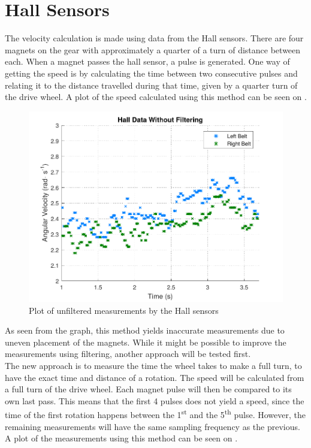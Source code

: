 \section{Hall Sensors}\label{sec:hallFiltering}

The velocity calculation is made using data from the Hall sensors. There are four magnets on the gear with approximately a quarter of a turn of distance between each. When a magnet passes the hall sensor, a pulse is generated. One way of getting the speed is by calculating the time between two consecutive pulses and relating it to the distance travelled during that time, given by a quarter turn of the drive wheel. A plot of the speed calculated using this method can be seen on .

\begin{figure}[H]
	\centering
	\includegraphics[scale=0.9]{figures/unfilteredHall.pdf}
	\caption{Plot of unfiltered measurements by the Hall sensors}
	\label{unfilteredHall}
\end{figure}


As seen from the graph, this method yields inaccurate measurements due to uneven placement of the magnets. While it might be possible to improve the measurements using filtering, another approach will be tested first.\\

The new approach is to measure the time the wheel takes to make a full turn, to have the exact time and distance of a rotation. The speed will be calculated from a full turn of the drive wheel. Each magnet pulse will then be compared to its own last pass. This means that the first 4 pulses does not yield a speed, since the time of the first rotation happens between the \si{1^{st}} and the \si{5^{th}} pulse. However, the remaining measurements will have the same sampling frequency as the previous. A plot of the measurements using this method can be seen on .

